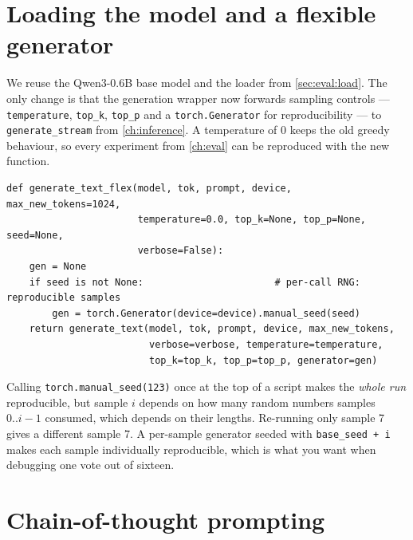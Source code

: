 \section{Loading the model and a flexible generator}\label{sec:scaling:load}


We reuse the Qwen3-0.6B base model and the loader from \cref{sec:eval:load}. The only change is
that the generation wrapper now forwards sampling controls --- \texttt{temperature},
\texttt{top\_k}, \texttt{top\_p} and a \texttt{torch.Generator} for reproducibility --- to
\texttt{generate\_stream} from \cref{ch:inference}. A temperature of 0 keeps the old greedy
behaviour, so every experiment from \cref{ch:eval} can be reproduced with the new function.

\begin{lstlisting}[caption={The generation wrapper with sampling knobs (extends \cref{lst:eval:wrapper}).},label={lst:scaling:flex}]
def generate_text_flex(model, tok, prompt, device, max_new_tokens=1024,
                       temperature=0.0, top_k=None, top_p=None, seed=None,
                       verbose=False):
    gen = None
    if seed is not None:                       # per-call RNG: reproducible samples
        gen = torch.Generator(device=device).manual_seed(seed)
    return generate_text(model, tok, prompt, device, max_new_tokens,
                         verbose=verbose, temperature=temperature,
                         top_k=top_k, top_p=top_p, generator=gen)
\end{lstlisting}

\begin{pitfall}
Calling \texttt{torch.manual\_seed(123)} once at the top of a script makes the \emph{whole run}
reproducible, but sample $i$ depends on how many random numbers samples $0..i-1$ consumed, which
depends on their lengths. Re-running only sample 7 gives a different sample 7. A per-sample
generator seeded with \texttt{base\_seed + i} makes each sample individually reproducible, which
is what you want when debugging one vote out of sixteen.
\end{pitfall}

\section{Chain-of-thought prompting}\label{sec:scaling:cot}



